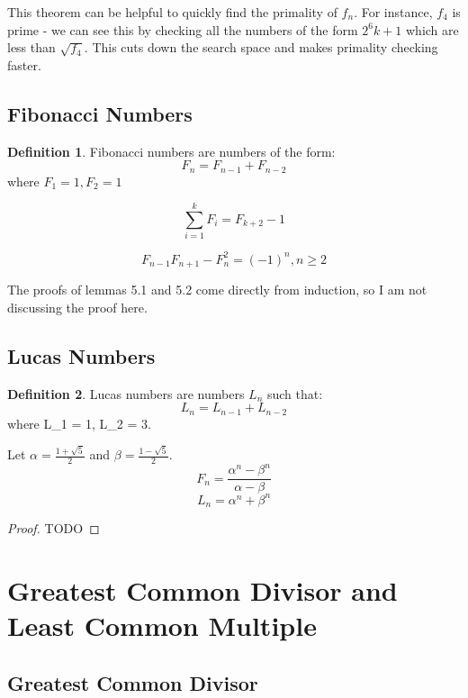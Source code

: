 \documentclass[12pt,letterpaper]{amsbook}
\theoremstyle{definition}
\newtheorem{definition}{Definition} %
\begin{document}
This theorem can be helpful to quickly find the primality of $f_n$. For instance, $f_4$ is prime - we can see this by checking all the numbers of the form $2^6 k+1$ which are less than $\sqrt{f_4}$. This cuts down the search space and makes primality checking faster.

\section{Fibonacci Numbers}

\begin{definition}
  Fibonacci numbers are numbers of the form:
  \[F_n = F_{n-1} + F_{n-2}\]
  where $F_1 = 1, F_2 = 1$
\end{definition}

\begin{lemma}
  \[\sum_{i=1}^{k} F_i = F_{k+2}-1\]
\end{lemma}

\begin{lemma}
  \[F_{n-1}F_{n+1} - F_n^2 = (-1)^n, n \geq 2\]
\end{lemma}

The proofs of lemmas 5.1 and 5.2 come directly from induction, so I am not discussing the proof here.

\section{Lucas Numbers}

\begin{definition}
  Lucas numbers are numbers $L_n$ such that:
  \[L_n =L_{n-1} + L_{n-2}\]
  where L_1 = 1, L_2 = 3.
\end{definition}

\begin{theorem}
  Let $\alpha = \frac{1+\sqrt 5}{2}$ and $\beta = \frac{1-\sqrt 5}{2}$.
  \[F_n = \frac{\alpha^n-\beta^n}{\alpha-\beta}\]
  \[L_n = \alpha^n + \beta^n\]
\end{theorem}
\begin{proof}
 TODO  
\end{proof}

\chapter{Greatest Common Divisor and Least Common Multiple}

\section{Greatest Common Divisor}
\end{document}
